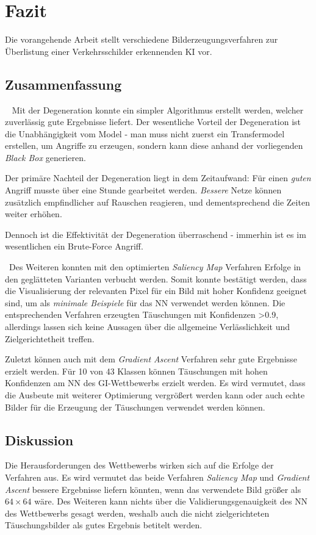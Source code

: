 \chapter{Fazit}
\label{cha:Fazit} \label{cha:Schluss}
Die vorangehende Arbeit stellt verschiedene Bilderzeugungsverfahren zur Überlistung einer Verkehrsschilder erkennenden \ac{KI} vor. 

\section{Zusammenfassung} ~\newline 
Mit der Degeneration konnte ein simpler Algorithmus erstellt werden, welcher zuverlässig gute Ergebnisse liefert. 
Der wesentliche Vorteil der Degeneration ist die Unabhängigkeit vom Model - man muss nicht zuerst ein Transfermodel erstellen, um Angriffe zu erzeugen, sondern kann diese anhand der vorliegenden \textit{Black Box} generieren.  

Der primäre Nachteil der Degeneration liegt in dem Zeitaufwand: Für einen \textit{guten} Angriff musste über eine Stunde gearbeitet werden. \textit{Bessere} Netze können zusätzlich empfindlicher auf Rauschen reagieren, und dementsprechend die Zeiten weiter erhöhen. 
  
Dennoch ist die Effektivität der Degeneration überraschend - immerhin ist es im wesentlichen ein Brute-Force Angriff. 

~\newline Des Weiteren konnten mit den optimierten \textit{Saliency Map} Verfahren Erfolge in den geglätteten Varianten verbucht werden. Somit konnte bestätigt werden, dass die Visualisierung der relevanten Pixel für ein Bild mit hoher Konfidenz geeignet sind, um als \textit{minimale Beispiele} für das NN verwendet werden können. 
Die entsprechenden Verfahren erzeugten Täuschungen mit Konfidenzen >0.9, allerdings lassen sich keine Aussagen über die allgemeine Verlässlichkeit und Zielgerichtetheit treffen.

Zuletzt können auch mit dem \textit{Gradient Ascent} Verfahren sehr gute Ergebnisse erzielt werden. Für 10 von 43 Klassen können Täuschungen mit hohen Konfidenzen am \ac{NN} des \ac{GI}-Wettbewerbs erzielt werden. Es wird vermutet, dass die Ausbeute mit weiterer Optimierung vergrößert werden kann oder auch echte Bilder für die Erzeugung der Täuschungen verwendet werden können. 


\section{Diskussion}
Die Herausforderungen des Wettbewerbs wirken sich auf die Erfolge der Verfahren aus. Es wird vermutet das beide Verfahren \textit{Saliency Map} und \textit{Gradient Ascent} bessere Ergebnisse liefern könnten, wenn das verwendete Bild größer als $64\times64$ wäre. Des Weiteren kann nichts über die Validierungsgenauigkeit des \ac{NN} des Wettbewerbs gesagt werden, weshalb auch die nicht zielgerichteten Täuschungsbilder als gutes Ergebnis betitelt werden. 


